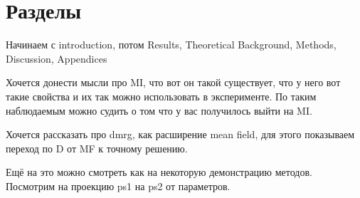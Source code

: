\section{Разделы}

Начинаем с introduction, потом Results, Theoretical Background, Methods, Discussion, Appendices

Хочется донести мысли про MI, что вот он такой существует, что у него вот такие свойства и их так можно использовать в эксперименте. По таким наблюдаемым можно судить о том что у вас получилось выйти на MI. 

Хочется рассказать про dmrg, как расширение mean field, для этого показываем переход по D от MF к точному решению. 

Ещё на это можно смотреть как на некоторую демонстрацию методов. Посмотрим на проекцию ps1 на ps2 от параметров. 